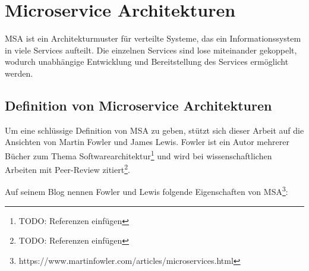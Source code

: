 \newpage
\section{Microservice Architekturen} \label{msa}


MSA ist ein Architekturmuster für verteilte Systeme, das ein Informationssystem
in viele Services aufteilt. Die einzelnen Services sind lose miteinander
gekoppelt, wodurch unabhängige Entwicklung und Bereitstellung des Services
ermöglicht werden.

\subsection{Definition von Microservice Architekturen}

Um eine schlüssige Definition von MSA zu geben, stützt sich dieser Arbeit auf
die Ansichten von Martin Fowler und James Lewis. Fowler ist ein Autor mehrerer Bücher zum Thema
Softwarearchitektur\footnote{TODO: Referenzen einfügen} und wird bei
wissenschaftlichen Arbeiten mit Peer-Review zitiert\footnote{TODO: Referenzen
einfügen}.

Auf seinem Blog nennen Fowler und Lewis folgende Eigenschaften von
MSA\footnote{https://www.martinfowler.com/articles/microservices.html}:

